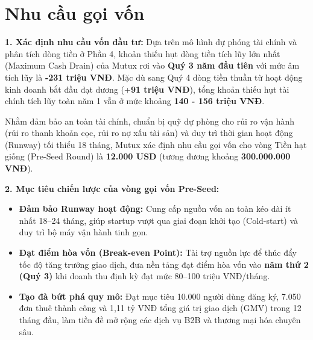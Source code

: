 \section{Nhu cầu gọi vốn}

\textbf{1. Xác định nhu cầu vốn đầu tư:}
Dựa trên mô hình dự phóng tài chính và phân tích dòng tiền ở Phần 4, khoản thiếu hụt dòng tiền tích lũy lớn nhất (Maximum Cash Drain) của Mutux rơi vào \textbf{Quý 3 năm đầu tiên} với mức âm tích lũy là \textbf{-231 triệu VNĐ}. Mặc dù sang Quý 4 dòng tiền thuần từ hoạt động kinh doanh bắt đầu đạt dương (+\textbf{91 triệu VNĐ}), tổng khoản thiếu hụt tài chính tích lũy toàn năm 1 vẫn ở mức khoảng \textbf{140 - 156 triệu VNĐ}.

Nhằm đảm bảo an toàn tài chính, chuẩn bị quỹ dự phòng cho rủi ro vận hành (rủi ro thanh khoản cọc, rủi ro nợ xấu tài sản) và duy trì thời gian hoạt động (Runway) tối thiểu 18 tháng, Mutux xác định nhu cầu gọi vốn cho vòng Tiền hạt giống (Pre-Seed Round) là \textbf{12.000 USD} (tương đương khoảng \textbf{300.000.000 VNĐ}).

\textbf{2. Mục tiêu chiến lược của vòng gọi vốn Pre-Seed:}
\begin{itemize}
    \item \textbf{Đảm bảo Runway hoạt động:} Cung cấp nguồn vốn an toàn kéo dài ít nhất 18--24 tháng, giúp startup vượt qua giai đoạn khởi tạo (Cold-start) và duy trì bộ máy vận hành tinh gọn.
    \item \textbf{Đạt điểm hòa vốn (Break-even Point):} Tài trợ nguồn lực để thúc đẩy tốc độ tăng trưởng giao dịch, đưa nền tảng đạt điểm hòa vốn vào \textbf{năm thứ 2 (Quý 3)} khi doanh thu định kỳ đạt mức 80--100 triệu VNĐ/tháng.
    \item \textbf{Tạo đà bứt phá quy mô:} Đạt mục tiêu 10.000 người dùng đăng ký, 7.050 đơn thuê thành công và 1,11 tỷ VNĐ tổng giá trị giao dịch (GMV) trong 12 tháng đầu, làm tiền đề mở rộng các dịch vụ B2B và thương mại hóa chuyên sâu.
\end{itemize}
